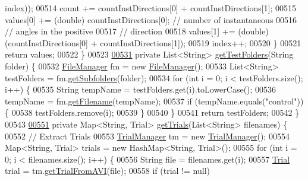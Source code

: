\begin{DoxyCode}
{      index));
00514       count += countInstDirections[0] + countInstDirections[1];
00515       values[0] += (double) countInstDirections[0]; \textcolor{comment}{// number of instantaneous}
00516                                                     \textcolor{comment}{// angles in the positive}
00517                                                     \textcolor{comment}{// direction}
00518       values[1] += (double) (countInstDirections[0] + countInstDirections[1]);
00519       index++;
00520     \}
00521     \textcolor{keywordflow}{return} values;
00522   \}
00523 
\hypertarget{_chemotaxis_8java_source_l00531}{}\hyperlink{classanalysis_1_1_chemotaxis_a973011dfbed998ea23443c2b79ac9ee3}{00531}   \textcolor{keyword}{private} List<String> \hyperlink{classanalysis_1_1_chemotaxis_a973011dfbed998ea23443c2b79ac9ee3}{getTestFolders}(String folder) \{
00532     \hyperlink{classfunctions_1_1_file_manager}{FileManager} fm = \textcolor{keyword}{new} \hyperlink{classfunctions_1_1_file_manager}{FileManager}();
00533     List<String> testFolders = fm.\hyperlink{classfunctions_1_1_file_manager_a73efd872c86ccdce535ddb2798aaaea4}{getSubfolders}(folder);
00534     \textcolor{keywordflow}{for} (\textcolor{keywordtype}{int} i = 0; i < testFolders.size(); i++) \{
00535       String tempName = testFolders.get(i).toLowerCase();
00536       tempName = fm.\hyperlink{classfunctions_1_1_file_manager_ad027758f34214960a7aa800e0f7c19db}{getFilename}(tempName);
00537       \textcolor{keywordflow}{if} (tempName.equals(\textcolor{stringliteral}{"control"})) \{
00538         testFolders.remove(i);
00539       \}
00540     \}
00541     \textcolor{keywordflow}{return} testFolders;
00542   \}
00543 
\hypertarget{_chemotaxis_8java_source_l00551}{}\hyperlink{classanalysis_1_1_chemotaxis_a5580224f7f7e9df7d925ad14f9364d98}{00551}   \textcolor{keyword}{private} Map<String, Trial> \hyperlink{classanalysis_1_1_chemotaxis_a5580224f7f7e9df7d925ad14f9364d98}{getTrials}(List<String> filenames) \{
00552     \textcolor{comment}{// Extract Trials}
00553     \hyperlink{classfunctions_1_1_trial_manager}{TrialManager} tm = \textcolor{keyword}{new} \hyperlink{classfunctions_1_1_trial_manager}{TrialManager}();
00554     Map<String, Trial> trials = \textcolor{keyword}{new} HashMap<String, Trial>();
00555     \textcolor{keywordflow}{for} (\textcolor{keywordtype}{int} i = 0; i < filenames.size(); i++) \{
00556       String file = filenames.get(i);
00557       \hyperlink{classdata_1_1_trial}{Trial} trial = tm.\hyperlink{classfunctions_1_1_trial_manager_a5d815ce30de28983d08c22c909562e11}{getTrialFromAVI}(file);
00558       \textcolor{keywordflow}{if} (trial != null)
}
\end{DoxyCode}
